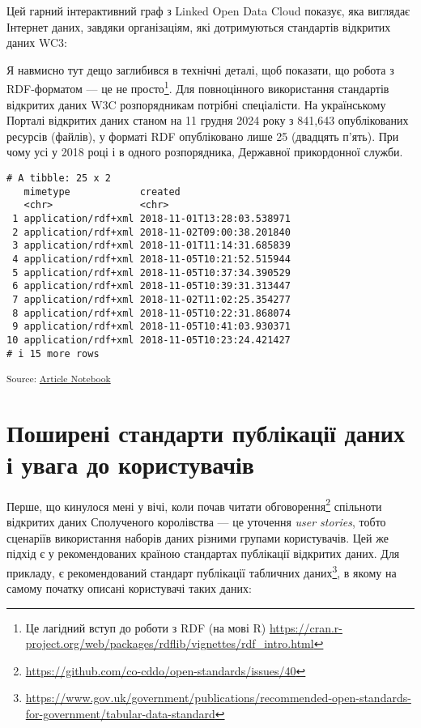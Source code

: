 \documentclass[
]{agujournal2019}
\begin{document}
Цей гарний інтерактивний граф з Linked Open Data Cloud показує, яка
виглядає Інтернет даних, завдяки організаціям, які дотримуються
стандартів відкритих даних WC3:

Я навмисно тут дещо заглибився в технічні деталі, щоб показати, що
робота з RDF-форматом --- це не просто\footnote{Це лагідний вступ до
  роботи з RDF (на мові R)
  \url{https://cran.r-project.org/web/packages/rdflib/vignettes/rdf_intro.html}}.
Для повноцінного використання стандартів відкритих даних W3C
розпорядникам потрібні спеціалісти. На українському Порталі відкритих
даних станом на 11 грудня 2024 року з 841,643 опублікованих ресурсів
(файлів), у форматі RDF опубліковано лише 25 (двадцять п'ять). При чому
усі у 2018 році і в одного розпорядника, Державної прикордонної служби.

\begin{verbatim}
# A tibble: 25 x 2
   mimetype            created                   
   <chr>               <chr>                     
 1 application/rdf+xml 2018-11-01T13:28:03.538971
 2 application/rdf+xml 2018-11-02T09:00:38.201840
 3 application/rdf+xml 2018-11-01T11:14:31.685839
 4 application/rdf+xml 2018-11-05T10:21:52.515944
 5 application/rdf+xml 2018-11-05T10:37:34.390529
 6 application/rdf+xml 2018-11-05T10:39:31.313447
 7 application/rdf+xml 2018-11-02T11:02:25.354277
 8 application/rdf+xml 2018-11-05T10:22:31.868074
 9 application/rdf+xml 2018-11-05T10:41:03.930371
10 application/rdf+xml 2018-11-05T10:23:24.421427
# i 15 more rows
\end{verbatim}

\textsubscript{Source:
\href{https://mykuzin.github.io/machine-readability-and-open-data/index.qmd.html}{Article
Notebook}}

\section{Поширені стандарти публікації даних і увага до
користувачів}\label{sec-data-methods}

Перше, що кинулося мені у вічі, коли почав читати обговорення\footnote{\url{https://github.com/co-cddo/open-standards/issues/40}}
спільноти відкритих даних Сполученого королівства --- це уточення
\emph{user stories}, тобто сценаріїв використання наборів даних різними
групами користувачів. Цей же підхід є у рекомендованих країною
стандартах публікації відкритих даних. Для прикладу, є рекомендований
стандарт публікації табличних даних\footnote{\url{https://www.gov.uk/government/publications/recommended-open-standards-for-government/tabular-data-standard}},
в якому на самому початку описані користувачі таких даних:
\end{document}
